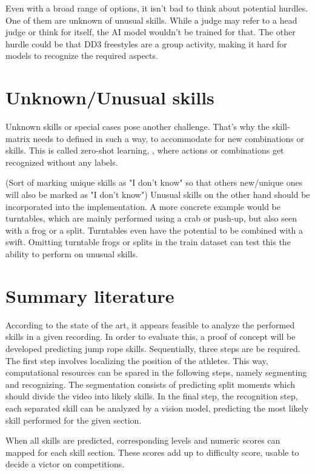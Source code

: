 
Even with a broad range of options, it isn't bad to think about potential hurdles. One of them are unknown of unusual skills. While a judge may refer to a head judge or think for itself, the AI model wouldn't be trained for that. The other hurdle could be that DD3 freestyles are a group activity, making it hard for models to recognize the required aspects.


\section{Unknown/Unusual skills}
\label{lit:unknown-unusual-skills}

Unknown skills or special cases pose another challenge. That's why the skill-matrix needs to defined in such a way, to accommodate for new combinations or skills. This is called zero-shot learning, \autocite{Pourpanah_2022}, where actions or combinations get recognized without any labels.

(Sort of marking unique skills as "I don't know" so that others new/unique ones will also be marked as "I don't know") Unusual skills on the other hand should be incorporated into the implementation.
A more concrete example would be turntables, which are mainly performed using a crab or push-up, but also seen with a frog or a split.
Turntables even have the potential to be combined with a swift. Omitting turntable frogs or splits in the train dataset can test this the ability to perform on unusual skills.

\section{Summary literature}
\label{lit:-summary-literature}

According to the state of the art, it appears feasible to analyze the performed skills in a given recording. In order to evaluate this, a proof of concept will be developed predicting jump rope skills. Sequentially, three steps are be required. The first step involves localizing the position of the athletes. This way, computational resources can be spared in the following steps, namely segmenting and recognizing. The segmentation consists of predicting split moments which should divide the video into likely skills. In the final step, the recognition step, each separated skill can be analyzed by a vision model, predicting the most likely skill performed for the given section.

When all skills are predicted, corresponding levels and numeric scores can mapped for each skill section. These scores add up to difficulty score, usable to decide a victor on competitions.